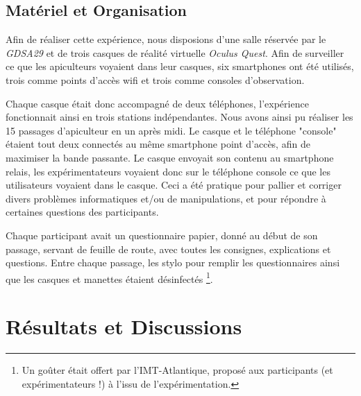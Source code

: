 		
		\subsection{Matériel et Organisation}
		Afin de réaliser cette expérience, nous disposions d'une salle réservée par le \textit{GDSA29} et de trois casques de réalité virtuelle \textit{Oculus Quest}. Afin de surveiller ce que les apiculteurs voyaient dans leur casques, six smartphones ont été utilisés, trois comme points d'accès wifi et trois comme consoles d'observation.
		
		Chaque casque était donc accompagné de deux téléphones, l'expérience fonctionnait ainsi en trois stations indépendantes. Nous avons ainsi pu réaliser les 15 passages d'apiculteur en un après midi. Le casque et le téléphone "console" étaient tout deux connectés au même smartphone point d'accès, afin de maximiser la bande passante. Le casque envoyait son contenu au smartphone relais, les expérimentateurs voyaient donc sur le téléphone console ce que les utilisateurs voyaient dans le casque. Ceci a été pratique pour pallier et corriger divers problèmes informatiques et/ou de manipulations, et pour répondre à certaines questions des participants.
		
		Chaque participant avait un questionnaire papier, donné au début de son passage, servant de feuille de route, avec toutes les consignes, explications et questions. Entre chaque passage, les stylo pour remplir les questionnaires ainsi que les casques et manettes étaient désinfectés \footnote{Un goûter était offert par l'IMT-Atlantique, proposé aux participants (et expérimentateurs !) à l'issu de l'expérimentation.}. 		
		
		
	\section{Résultats et Discussions}
	
